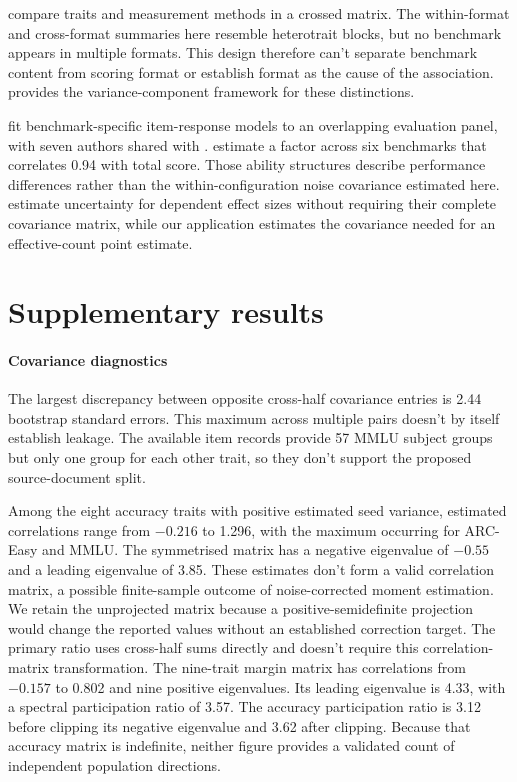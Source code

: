 \citet{campbell1959} compare traits and measurement methods in a crossed matrix. The within-format and cross-format summaries here resemble heterotrait blocks, but no benchmark appears in multiple formats. This design therefore can't separate benchmark content from scoring format or establish format as the cause of the association. \citet{brennan2001} provides the variance-component framework for these distinctions.

\citet{hofmann2025} fit benchmark-specific item-response models to an overlapping evaluation panel, with seven authors shared with \citet{heineman2025}. \citet{kipnis2024} estimate a factor across six benchmarks that correlates 0.94 with total score. Those ability structures describe performance differences rather than the within-configuration noise covariance estimated here. \citet{hedges2010} estimate uncertainty for dependent effect sizes without requiring their complete covariance matrix, while our application estimates the covariance needed for an effective-count point estimate.

\section{Supplementary results}
\label{app:supplementary}

\paragraph{Covariance diagnostics}
The largest discrepancy between opposite cross-half covariance entries is 2.44 bootstrap standard errors. This maximum across multiple pairs doesn't by itself establish leakage. The available item records provide 57 MMLU subject groups but only one group for each other trait, so they don't support the proposed source-document split.

Among the eight accuracy traits with positive estimated seed variance, estimated correlations range from $-0.216$ to 1.296, with the maximum occurring for ARC-Easy and MMLU. The symmetrised matrix has a negative eigenvalue of $-0.55$ and a leading eigenvalue of 3.85. These estimates don't form a valid correlation matrix, a possible finite-sample outcome of noise-corrected moment estimation. We retain the unprojected matrix because a positive-semidefinite projection would change the reported values without an established correction target. The primary ratio uses cross-half sums directly and doesn't require this correlation-matrix transformation. The nine-trait margin matrix has correlations from $-0.157$ to 0.802 and nine positive eigenvalues. Its leading eigenvalue is 4.33, with a spectral participation ratio of 3.57. The accuracy participation ratio is 3.12 before clipping its negative eigenvalue and 3.62 after clipping. Because that accuracy matrix is indefinite, neither figure provides a validated count of independent population directions.

